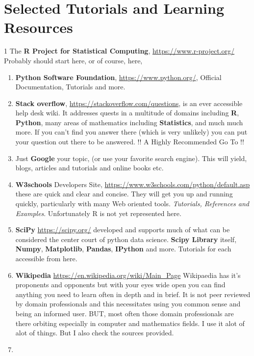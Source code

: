 \documentclass[]{book}
\theoremstyle{definition}
\theoremstyle{definition}
\theoremstyle{definition}
\theoremstyle{remark}
\begin{document}
\section{Selected Tutorials and Learning
Resources}\label{selected-tutorials-and-learning-resources}

1 The \textbf{R Project for Statistical Computing},
\url{https://www.r-project.org/} Probably should start here, or of
course, here,

\begin{enumerate}
\def\labelenumi{\arabic{enumi}.}
\setcounter{enumi}{1}
\item
  \textbf{Python Software Foundation}, \url{https://www.python.org/},
  Official Documentation, Tutorials and more.
\item
  \textbf{Stack overflow}, \url{https://stackoverflow.com/questions}, is
  an ever accessible help desk wiki. It addresses quests in a multitude
  of domains including \textbf{R}, \textbf{Python}, many areas of
  mathematics including \textbf{Statistics}, and much much more. If you
  can't find you answer there (which is very unlikely) you can put your
  question out there to be answered. !! A Highly Recommended Go To !!
\item
  Just \textbf{Google} your topic, (or use your favorite search engine).
  This will yield, blogs, articles and tutorials and online books etc.
\item
  \textbf{W3schools} Developers Site,
  \url{https://www.w3schools.com/python/default.asp} these are quick and
  clear and concise. They will get you up and running quickly,
  particularly with many Web oriented tools. \emph{Tutorials, References
  and Examples}. Unfortunately R is not yet represented here.
\item
  \textbf{SciPy} \url{https://scipy.org/} developed and supports much of
  what can be considered the center court of python data science.
  \textbf{Scipy Library} itself, \textbf{Numpy}, \textbf{Matplotlib},
  \textbf{Pandas}, \textbf{IPython} and more. Tutorials for each
  accessible from here.
\item
  \textbf{Wikipedia} \url{https://en.wikipedia.org/wiki/Main_Page}
  Wikipaedia has it's proponents and opponents but with your eyes wide
  open you can find anything you need to learn often in depth and in
  brief. It is not peer reviewed by domain professionals and this
  necessitates using you common sense and being an informed user. BUT,
  most often those domain professionals are there orbiting especially in
  computer and mathematics fields. I use it alot of alot of things. But
  I also check the sources provided.
\item
\end{enumerate}
\end{document}
